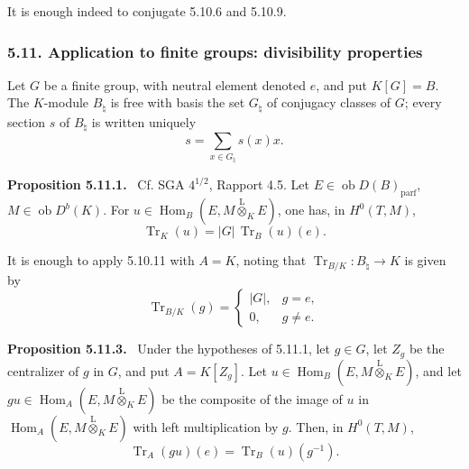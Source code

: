\documentclass[11pt]{article}
\newenvironment{statement}[1]{\par\medskip\noindent\textbf{#1.}\ }{\par\medskip}
\DeclareMathOperator{\Hom}{Hom}
\newcommand{\ob}{\operatorname{ob}}
\providecommand{\Tr}{\operatorname{Tr}}
\providecommand{\Tr}{\operatorname{Tr}}
\providecommand{\lten}{\overset{\mathrm L}{\otimes}}
\providecommand{\Tr}{\operatorname{Tr}}
\providecommand{\Hom}{\operatorname{Hom}}
\providecommand{\ob}{\operatorname{ob}}
\providecommand{\lten}{\overset{\mathrm L}{\otimes}}
\providecommand{\lten}{\overset{\mathrm L}{\otimes}}
\providecommand{\Tr}{\operatorname{Tr}}
\providecommand{\lten}{\overset{\mathrm L}{\otimes}}
\providecommand{\lten}{\overset{\mathrm L}{\otimes}}
\providecommand{\lten}{\overset{\mathrm L}{\otimes}}
\begin{document}
It is enough indeed to conjugate 5.10.6 and 5.10.9.

\subsubsection*{5.11. Application to finite groups: divisibility properties}

Let $G$ be a finite group, with neutral element denoted $e$, and put $K[G]=B$. The $K$-module $B_\natural$ is free with basis the set $G_\natural$ of conjugacy classes of $G$; every section $s$ of $B_\natural$ is written uniquely
\[
s=\sum_{x\in G_\natural}s(x)x.
\]

\begin{statement}{Proposition 5.11.1}
Cf. SGA $4^{1/2}$, Rapport 4.5. Let $E\in\ob D(B)_{\mathrm{parf}}$, $M\in\ob D^b(K)$. For $u\in\Hom_B(E,M\lten_KE)$, one has, in $H^0(T,M)$,
\begin{equation}\tag{5.11.1}
\Tr_K(u)=|G|\,\Tr_B(u)(e).
\end{equation}
\end{statement}
It is enough to apply 5.10.11 with $A=K$, noting that $\Tr_{B/K}:B_\natural\to K$ is given by
\begin{equation}\tag{5.11.2}
\Tr_{B/K}(g)=
\begin{cases}
|G|,& g=e,\\
0,& g\ne e.
\end{cases}
\end{equation}

\begin{statement}{Proposition 5.11.3}
Under the hypotheses of 5.11.1, let $g\in G$, let $Z_g$ be the centralizer of $g$ in $G$, and put $A=K[Z_g]$. Let $u\in\Hom_B(E,M\lten_KE)$, and let $gu\in\Hom_A(E,M\lten_KE)$ be the composite of the image of $u$ in $\Hom_A(E,M\lten_KE)$ with left multiplication by $g$. Then, in $H^0(T,M)$,
\begin{equation}\tag{5.11.4}
\Tr_A(gu)(e)=\Tr_B(u)(g^{-1}).
\end{equation}
\end{statement}
\end{document}
